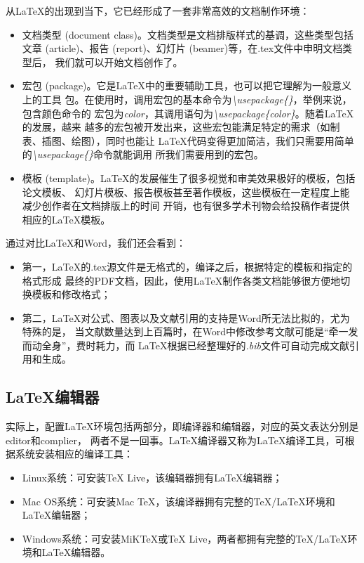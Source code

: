 从LaTeX的出现到当下，它已经形成了一套非常高效的文档制作环境：
\begin{itemize}
    \item 文档类型 (document class)。文档类型是文档排版样式的基调，这些类型包括
          文章 (article)、报告 (report)、幻灯片 (beamer)等，在.tex文件中申明文档类型后，
          我们就可以开始文档创作了。
    \item 宏包 (package)。它是LaTeX中的重要辅助工具，也可以把它理解为一般意义上的工具
          包。在使用时，调用宏包的基本命令为\emph{\textbackslash usepackage\{\}}，举例来说，包含颜色命令的
          宏包为\emph{color}，其调用语句为\emph{\textbackslash usepackage\{color\}}。随着LaTeX的发展，越来
          越多的宏包被开发出来，这些宏包能满足特定的需求（如制表、插图、绘图），同时也能让
          LaTeX代码变得更加简洁，我们只需要用简单的\emph{\textbackslash usepackage\{\}}命令就能调用
          所我们需要用到的宏包。
    \item 模板 (template)。LaTeX的发展催生了很多视觉和审美效果极好的模板，包括论文模板、
          幻灯片模板、报告模板甚至著作模板，这些模板在一定程度上能减少创作者在文档排版上的时间
          开销，也有很多学术刊物会给投稿作者提供相应的LaTeX模板。
\end{itemize}

通过对比LaTeX和Word，我们还会看到：
\begin{itemize}
    \item 第一，LaTeX的.tex源文件是无格式的，编译之后，根据特定的模板和指定的格式形成
          最终的PDF文档，因此，使用LaTeX制作各类文档能够很方便地切换模板和修改格式；
    \item 第二，LaTeX对公式、图表以及文献引用的支持是Word所无法比拟的，尤为特殊的是，
          当文献数量达到上百篇时，在Word中修改参考文献可能是“牵一发而动全身”，费时耗力，而
          LaTeX根据已经整理好的\emph{.bib}文件可自动完成文献引用和生成。
\end{itemize}

\subsection{\LaTeX 编辑器}
实际上，配置LaTeX环境包括两部分，即编译器和编辑器，对应的英文表达分别是editor和complier，
两者不是一回事。LaTeX编译器又称为LaTeX编译工具，可根据系统安装相应的编译工具：
\begin{itemize}
    \item Linux系统：可安装TeX Live，该编辑器拥有LaTeX编辑器；
    \item Mac OS系统：可安装Mac TeX，该编译器拥有完整的TeX/LaTeX环境和LaTeX编辑器；
    \item Windows系统：可安装MiKTeX或TeX Live，两者都拥有完整的TeX/LaTeX环境和LaTeX编辑器。
\end{itemize}

